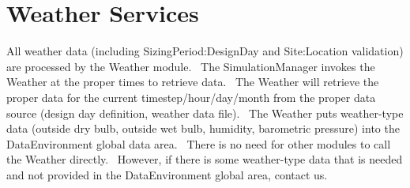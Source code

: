 \section{Weather Services}\label{weather-services}

All weather data (including SizingPeriod:DesignDay and Site:Location validation) are processed by the Weather module.~ The SimulationManager invokes the Weather at the proper times to retrieve data.~ The Weather will retrieve the proper data for the current timestep/hour/day/month from the proper data source (design day definition, weather data file).~ The Weather puts weather-type data (outside dry bulb, outside wet bulb, humidity, barometric pressure) into the DataEnvironment global data area.~ There is no need for other modules to call the Weather directly.~ However, if there is some weather-type data that is needed and not provided in the DataEnvironment global area, contact us.
